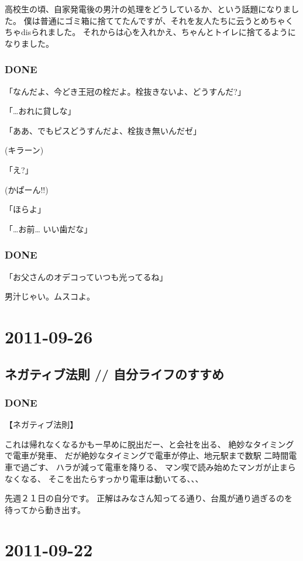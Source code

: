 \documentclass[11pt]{article}
\begin{document}
高校生の頃、自家発電後の男汁の処理をどうしているか、という話題になりました。
僕は普通にゴミ箱に捨ててたんですが、それを友人たちに云うとめちゃくちゃdisられました。
それからは心を入れかえ、ちゃんとトイレに捨てるようになりました。
\subsubsection{\textbf{DONE}}
\label{sec-65_1_3}

「なんだよ、今どき王冠の栓だよ。栓抜きないよ、どうすんだ?」

「\ldots{}おれに貸しな」

「ああ、でもピスどうすんだよ、栓抜き無いんだゼ」

(キラーン)

「え?」

(かぱーん!!)

「ほらよ」

「\ldots{}お前\ldots{} いい歯だな」
\subsubsection{\textbf{DONE}}
\label{sec-65_1_4}

「お父さんのオデコっていつも光ってるね」

男汁じゃい。ムスコよ。
\section{2011-09-26}
\label{sec-66}
\subsection{ネガティブ法則 // 自分ライフのすすめ}
\label{sec-66_1}
\subsubsection{\textbf{DONE}}
\label{sec-66_1_1}

【ネガティブ法則】

これは帰れなくなるかもー早めに脱出だー、と会社を出る、
絶妙なタイミングで電車が発車、
だが絶妙なタイミングで電車が停止、地元駅まで数駅
二時間電車で過ごす、
ハラが減って電車を降りる、
マン喫で読み始めたマンガが止まらなくなる、
そこを出たらすっかり電車は動いてる、、、

先週２１日の自分です。
正解はみなさん知ってる通り、台風が通り過ぎるのを待ってから動き出す。
\section{2011-09-22}
\label{sec-67}
\end{document}

